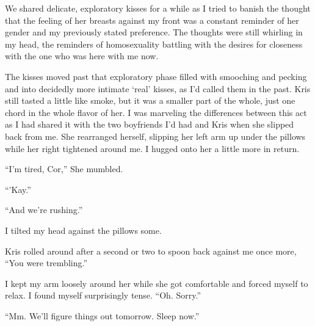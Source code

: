 We shared delicate, exploratory kisses for a while as I tried to banish the thought that the feeling of her breasts against my front was a constant reminder of her gender and my previously stated preference.  The thoughts were still whirling in my head, the reminders of homosexuality battling with the desires for closeness with the one who was here with me now.

The kisses moved past that exploratory phase filled with smooching and pecking and into decidedly more intimate `real' kisses, as I'd called them in the past.  Kris still tasted a little like smoke, but it was a smaller part of the whole, just one chord in the whole flavor of her.  I was marveling the differences between this act as I had shared it with the two boyfriends I'd had and Kris when she slipped back from me.  She rearranged herself, slipping her left arm up under the pillows while her right tightened around me.  I hugged onto her a little more in return.

``I'm tired, Cor,'' She mumbled.

``'Kay.''

``And we're rushing.''

I tilted my head against the pillows some.

Kris rolled around after a second or two to spoon back against me once more, ``You were trembling.''

I kept my arm loosely around her while she got comfortable and forced myself to relax.  I found myself surprisingly tense.  ``Oh.  Sorry.''

``Mm.  We'll figure things out tomorrow.  Sleep now.''
